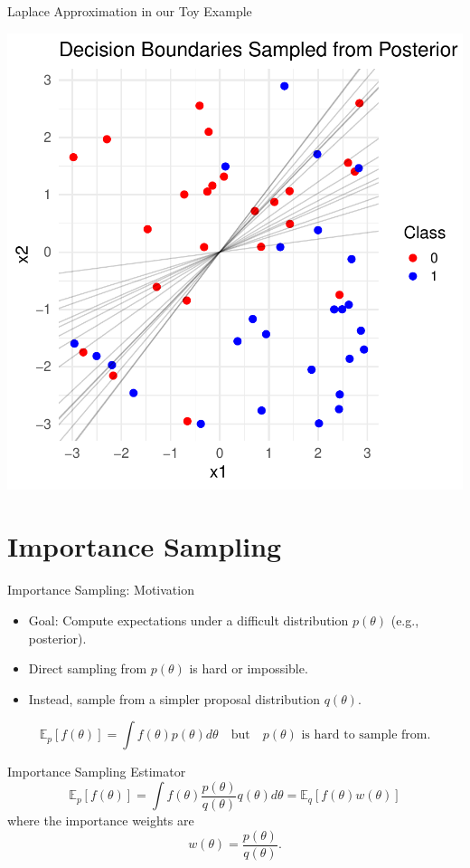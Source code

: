 \documentclass{beamer}
\begin{document}
\begin{frame}{Laplace Approximation in our Toy Example}

\begin{center}
  \includegraphics[width=0.6\linewidth]{laplace_decision_boundaries.pdf}
\end{center}

\end{frame}

\section{Importance Sampling}
\begin{frame}{Importance Sampling: Motivation}
\begin{itemize}
    \item Goal: Compute expectations under a difficult distribution \( p(\theta) \) (e.g., posterior).
    \item Direct sampling from \( p(\theta) \) is hard or impossible.
    \item Instead, sample from a simpler proposal distribution \( q(\theta) \).
\end{itemize}
\[
\mathbb{E}_{p}[f(\theta)] = \int f(\theta) p(\theta) d\theta \quad \text{but} \quad p(\theta) \text{ is hard to sample from}.
\]
\end{frame}

\begin{frame}{Importance Sampling Estimator}
\[
\mathbb{E}_{p}[f(\theta)] = \int f(\theta) \frac{p(\theta)}{q(\theta)} q(\theta) d\theta = \mathbb{E}_{q}\left[f(\theta) w(\theta)\right]
\]
where the \alert{importance weights} are
\[
w(\theta) = \frac{p(\theta)}{q(\theta)}.
\]
\end{frame}
\end{document}
